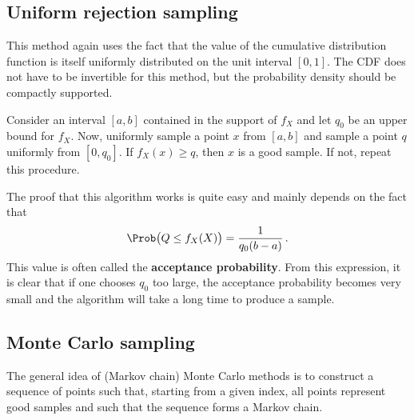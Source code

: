 \subsection{Uniform rejection sampling}

    This method again uses the fact that the value of the cumulative distribution function is itself uniformly distributed on the unit interval $[0,1]$. The CDF does not have to be invertible for this method, but the probability density should be compactly supported.

    \begin{method}
        Consider an interval $[a,b]$ contained in the support of $f_X$ and let $q_0$ be an upper bound for $f_X$. Now, uniformly sample a point $x$ from $[a,b]$ and sample a point $q$ uniformly from $[0,q_0]$. If $f_X(x)\geq q$, then $x$ is a good sample. If not, repeat this procedure.
    \end{method}

    The proof that this algorithm works is quite easy and mainly depends on the fact that
    \begin{gather}
        \Prob\bigl(Q\leq f_X(X)\bigr)=\frac{1}{q_0(b-a)}\,.
    \end{gather}
    This value is often called the \textbf{acceptance probability}. From this expression, it is clear that if one chooses $q_0$ too large, the acceptance probability becomes very small and the algorithm will take a long time to produce a sample.

\subsection{Monte Carlo sampling}

    The general idea of (Markov chain) Monte Carlo methods is to construct a sequence of points such that, starting from a given index, all points represent good samples and such that the sequence forms a Markov chain.

